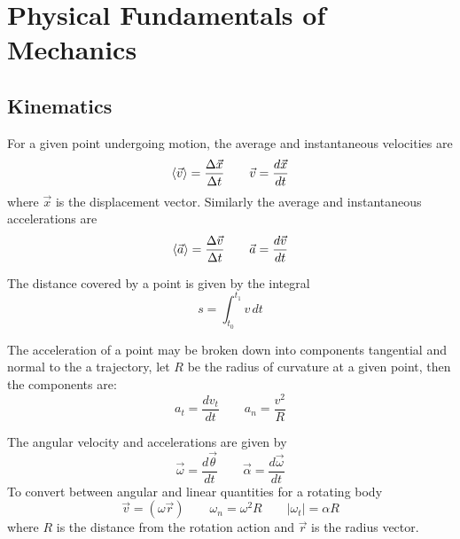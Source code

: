 \section{Physical Fundamentals of Mechanics}
\subsection{Kinematics}
For a given point undergoing motion, the average and instantaneous velocities are
\[ \left\langle \vec{v} \right\rangle = \frac{\Delta \vec x}{\Delta t} \qquad \vec v = \frac{d\vec x}{dt} \]
where $\vec x$ is the displacement vector. Similarly the average and instantaneous accelerations are
\[ \left\langle \vec a \right\rangle = \frac{\Delta \vec v}{\Delta t} \qquad \vec a = \frac{d\vec v}{dt} \]
 
The distance covered by a point is given by the integral
\[ s = \int_{t_0}^{t_1} v \, dt \] 
 
The acceleration of a point may be broken down into components tangential and normal to the a trajectory, let $R$ be the radius of curvature at a given point, then the components are:
 \[ a_t = \frac{d v_t}{dt} \qquad a_n = \frac{v^2}{R} \]
 
The angular velocity and accelerations are given by
\[ \vec{\omega} = \frac{d\vec\theta}{dt} \qquad \vec\alpha = \frac{d\vec\omega}{dt} \]
To convert between angular and linear quantities for a rotating body
\[ \vec{v} = (\omega \vec r) \qquad \omega_n = \omega^2 R \qquad |\omega_t| = \alpha R \]
where $R$ is the distance from the rotation action and $\vec r$ is the radius vector.

\begin{exercise}

\end{exercise}

\begin{exercise}
\end{exercise}

\begin{exercise}
\end{exercise}

\begin{exercise}
\end{exercise}

\begin{exercise}
\end{exercise}

\begin{exercise}
\end{exercise}

